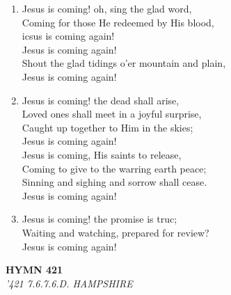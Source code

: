 \documentclass[11pt,a4paper]{article}
\begin{document}
\begin{enumerate}
    \item Jesus is coming! oh, sing the glad word, \\
        Coming for those He redeemed by His blood, \\
        icsus is coming again! \\
        Jesus is coming again! \\
        Shout the glad tidings o'er mountain and plain, \\
        Jesus is coming again!

    \item Jesus is coming! the dead shall arise, \\
        Loved ones shall meet in a joyful surprise, \\
        Caught up together to Him in the skies; \\
        Jesus is coming again! \\
        Jesus is coming, His saints to release, \\
        Coming to give to the warring earth peace; \\
        Sinning and sighing and sorrow shall cease. \\
        Jesus is coming again!

    \item Jesus is coming! the promise is truc; \\
        Waiting and watching, prepared for review? \\
        Jesus is coming again!

\end{enumerate}

\newpage
\begin{center}
    {\Large \textbf{HYMN 421}}
    \\
    \textit{'421 7.6.7.6.D. HAMPSHIRE}
\end{center}
\vspace{1em}
\end{document}
